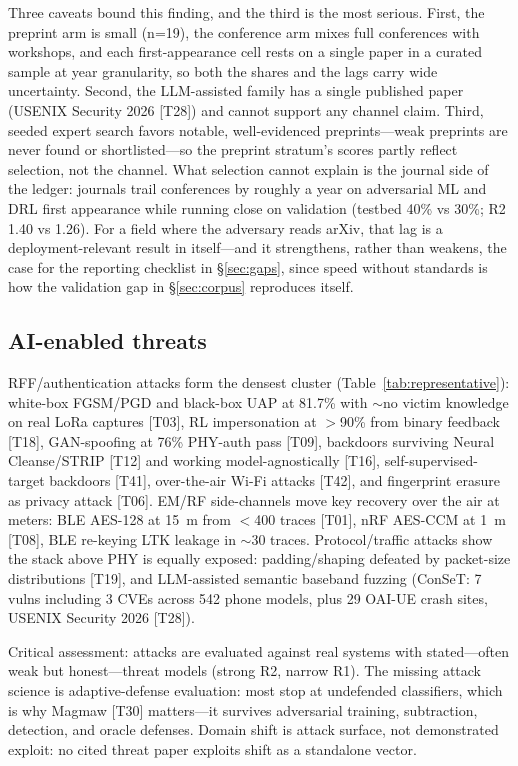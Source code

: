 Three caveats bound this finding, and the third is the most serious. First, the preprint arm is small (n=19), the conference arm mixes full conferences with workshops, and each first-appearance cell rests on a single paper in a curated sample at year granularity, so both the shares and the lags carry wide uncertainty. Second, the LLM-assisted family has a single published paper (USENIX Security 2026 [T28]) and cannot support any channel claim. Third, seeded expert search favors notable, well-evidenced preprints---weak preprints are never found or shortlisted---so the preprint stratum's scores partly reflect selection, not the channel. What selection cannot explain is the journal side of the ledger: journals trail conferences by roughly a year on adversarial ML and DRL first appearance while running close on validation (testbed 40\% vs 30\%; R2 1.40 vs 1.26). For a field where the adversary reads arXiv, that lag is a deployment-relevant result in itself---and it strengthens, rather than weakens, the case for the reporting checklist in \S\ref{sec:gaps}, since speed without standards is how the validation gap in \S\ref{sec:corpus} reproduces itself.

\subsection{AI-enabled threats}
\label{sec:threat}
RFF/authentication attacks form the densest cluster (Table~\ref{tab:representative}): white-box FGSM/PGD and black-box UAP at 81.7\% with $\sim$no victim knowledge on real LoRa captures [T03], RL impersonation at $>$90\% from binary feedback [T18], GAN-spoofing at 76\% PHY-auth pass [T09], backdoors surviving Neural Cleanse/STRIP [T12] and working model-agnostically [T16], self-supervised-target backdoors [T41], over-the-air Wi-Fi attacks [T42], and fingerprint erasure as privacy attack [T06]. EM/RF side-channels move key recovery over the air at meters: BLE AES-128 at 15~m from $<$400 traces [T01], nRF AES-CCM at 1~m [T08], BLE re-keying LTK leakage in $\sim$30 traces. Protocol/traffic attacks show the stack above PHY is equally exposed: padding/shaping defeated by packet-size distributions [T19], and LLM-assisted semantic baseband fuzzing (ConSeT: 7 vulns including 3 CVEs across 542 phone models, plus 29 OAI-UE crash sites, USENIX Security 2026 [T28]).

Critical assessment: attacks are evaluated against real systems with stated---often weak but honest---threat models (strong R2, narrow R1). The missing attack science is adaptive-defense evaluation: most stop at undefended classifiers, which is why Magmaw [T30] matters---it survives adversarial training, subtraction, detection, and oracle defenses. Domain shift is attack surface, not demonstrated exploit: no cited threat paper exploits shift as a standalone vector.

